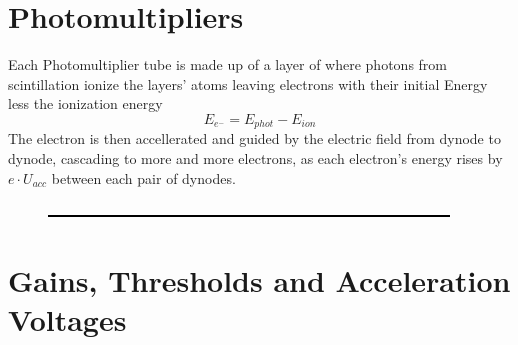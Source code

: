   
  
  \section{Photomultipliers}
  \label{ch:The muon detection system:sec:Photomultipliers}
  Each Photomultiplier tube is made up of a layer of  where photons from scintillation ionize the layers' atoms leaving electrons with their initial Energy less the ionization energy 
  $$E_{e^-} = E_{phot} - E_{ion}$$
  The electron is then accellerated and guided by the electric field from dynode to dynode, cascading to more and more electrons, as each electron's energy rises by $e\cdot U_{acc}$ between each pair of dynodes.
  \begin{figure}
  	\centering
  	\includegraphics[width = 0.5 \textwidth]{graphics/dummy.eps}
  \end{figure}

  
  
  \section{Gains, Thresholds and Acceleration Voltages}
  \label{ch:The muon detection system:sec:Gains, Thresholds and Acceleration Voltages}
  
